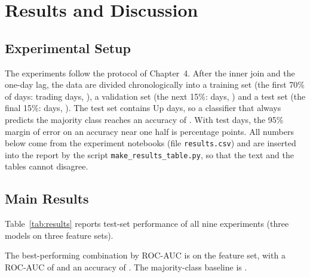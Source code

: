\chapter{Results and Discussion}

\section{Experimental Setup}
The experiments follow the protocol of Chapter~4. After the inner join and the one-day lag, the data are divided chronologically into a training set (the first 70\% of days: \TrainDays{} trading days, \TrainRange{}), a validation set (the next 15\%: \ValDays{} days, \ValRange{}) and a test set (the final 15\%: \TestDays{} days, \TestRange{}). The test set contains \UpShareTest{} Up days, so a classifier that always predicts the majority class reaches an accuracy of \BaselineAcc{}. With \TestDays{} test days, the 95\% margin of error on an accuracy near one half is \MarginErr{} percentage points. All numbers below come from the experiment notebooks (file \texttt{results.csv}) and are inserted into the report by the script \texttt{make\_results\_table.py}, so that the text and the tables cannot disagree.

\section{Main Results}
Table~\ref{tab:results} reports test-set performance of all nine experiments (three models on three feature sets).

\begin{table}[!htbp]
\centering
\small
\setlength{\tabcolsep}{4pt}

\caption{Test-set performance of each model on each feature set.}
\label{tab:results}
\end{table}

The best-performing combination by ROC-AUC is \BestModel{} on the \BestFeatureSet{} feature set, with a ROC-AUC of \BestAUC{} and an accuracy of \BestAcc{}. The majority-class baseline is \BaselineAcc{}.

